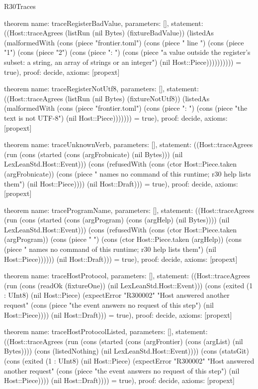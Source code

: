 \begin{lexlean}{R30Traces}
\begin{semanticmodule}
theorem{
  name: traceRegisterBadValue,
  parameters: [],
  statement: ((Host::traceAgrees (listRun (nil Bytes) (fixtureBadValue)) (listedAs (malformedWith (cons (piece "frontier.toml") (cons (piece " line ") (cons (piece "1") (cons (piece "2") (cons (piece ": ") (cons (piece "a value outside the register's subset: a string, an array of strings or an integer") (nil Host::Piece)))))))))) = true),
  proof: decide{},
  axioms: [propext]
}

theorem{
  name: traceRegisterNotUtf8,
  parameters: [],
  statement: ((Host::traceAgrees (listRun (nil Bytes) (fixtureNotUtf8)) (listedAs (malformedWith (cons (piece "frontier.toml") (cons (piece ": ") (cons (piece "the text is not UTF-8") (nil Host::Piece))))))) = true),
  proof: decide{},
  axioms: [propext]
}

theorem{
  name: traceUnknownVerb,
  parameters: [],
  statement: ((Host::traceAgrees (run (cons (started (cons (argFrobnicate) (nil Bytes))) (nil LexLeanStd.Host::Event))) (cons (refusedWith (cons (ctor Host::Piece.taken (argFrobnicate)) (cons (piece " names no command of this runtime; r30 help lists them") (nil Host::Piece)))) (nil Host::Draft))) = true),
  proof: decide{},
  axioms: [propext]
}

theorem{
  name: traceProgramName,
  parameters: [],
  statement: ((Host::traceAgrees (run (cons (started (cons (argProgram) (cons (argHelp) (nil Bytes)))) (nil LexLeanStd.Host::Event))) (cons (refusedWith (cons (ctor Host::Piece.taken (argProgram)) (cons (piece " ") (cons (ctor Host::Piece.taken (argHelp)) (cons (piece " names no command of this runtime; r30 help lists them") (nil Host::Piece)))))) (nil Host::Draft))) = true),
  proof: decide{},
  axioms: [propext]
}

theorem{
  name: traceHostProtocol,
  parameters: [],
  statement: ((Host::traceAgrees (run (cons (readOk (fixtureOne)) (nil LexLeanStd.Host::Event))) (cons (exited (1 : UInt8) (nil Host::Piece) (expectError "R300002" "Host answered another request" (cons (piece "the event answers no request of this step") (nil Host::Piece)))) (nil Host::Draft))) = true),
  proof: decide{},
  axioms: [propext]
}

theorem{
  name: traceHostProtocolListed,
  parameters: [],
  statement: ((Host::traceAgrees (run (cons (started (cons (argFrontier) (cons (argList) (nil Bytes)))) (cons (listedNothing) (nil LexLeanStd.Host::Event)))) (cons (statsGit) (cons (exited (1 : UInt8) (nil Host::Piece) (expectError "R300002" "Host answered another request" (cons (piece "the event answers no request of this step") (nil Host::Piece)))) (nil Host::Draft)))) = true),
  proof: decide{},
  axioms: [propext]
}


\end{semanticmodule}
\end{lexlean}
